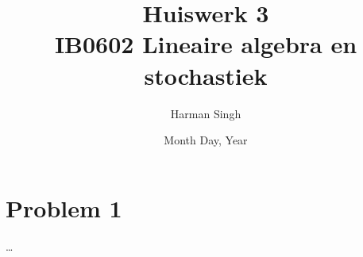 \documentclass[11pt, a4paper]{article}
\title{Huiswerk 3 \\ IB0602 Lineaire algebra en stochastiek}
\author{Harman Singh}
\date{Month Day, Year}
\begin{document}
\maketitle

\pagebreak
\section*{Problem 1}





\ldots
\end{document}
